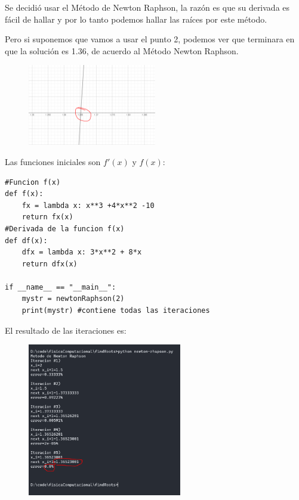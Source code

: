 \documentclass[a4paper,12pt]{article}
\newcommand{\eq}[1]{$#1$}
\begin{document}
    Se decidió usar 
    el Método de Newton Raphson, la razón es que su derivada es fácil 
    de hallar y por lo tanto
    podemos hallar las raíces por este método.

    Pero si suponemos que vamos a usar el punto 2, podemos ver que terminara en 
    que la solución es 1.36, de acuerdo al Método Newton Raphson.

    \begin{figure}[h]
        \centering
        \includegraphics[width=0.5\textwidth]{f7_2.PNG}
    \end{figure}
\newpage

Las funciones iniciales son \eq{f'(x)} y \eq{f(x)}:

\begin{lstlisting}
#Funcion f(x)
def f(x):
    fx = lambda x: x**3 +4*x**2 -10
    return fx(x)
#Derivada de la funcion f(x)
def df(x):
    dfx = lambda x: 3*x**2 + 8*x
    return dfx(x)

if __name__ == "__main__":
    mystr = newtonRaphson(2)
    print(mystr) #contiene todas las iteraciones
\end{lstlisting}
    El resultado de las iteraciones es:
    \begin{figure}[h]
        \centering
        \includegraphics[width=0.6\textwidth]{f7console.PNG}
    \end{figure}
\end{document}
